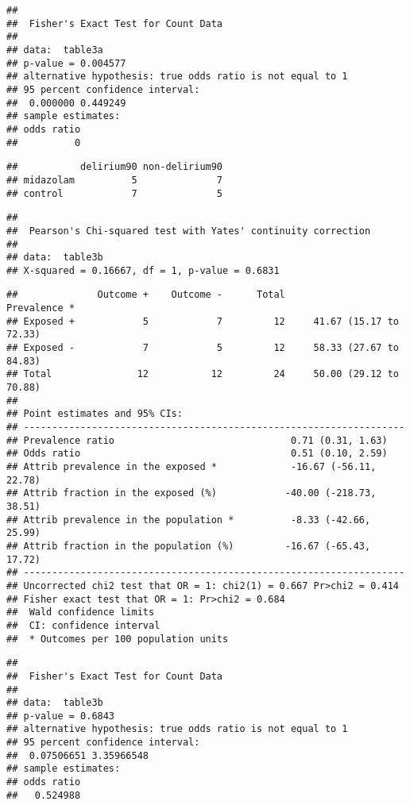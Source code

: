 \documentclass[
]{article}
\begin{document}
\begin{verbatim}
## 
##  Fisher's Exact Test for Count Data
## 
## data:  table3a
## p-value = 0.004577
## alternative hypothesis: true odds ratio is not equal to 1
## 95 percent confidence interval:
##  0.000000 0.449249
## sample estimates:
## odds ratio 
##          0
\end{verbatim}

\begin{verbatim}
##           delirium90 non-delirium90
## midazolam          5              7
## control            7              5
\end{verbatim}

\begin{verbatim}
## 
##  Pearson's Chi-squared test with Yates' continuity correction
## 
## data:  table3b
## X-squared = 0.16667, df = 1, p-value = 0.6831
\end{verbatim}

\begin{verbatim}
##              Outcome +    Outcome -      Total               Prevalence *
## Exposed +            5            7         12     41.67 (15.17 to 72.33)
## Exposed -            7            5         12     58.33 (27.67 to 84.83)
## Total               12           12         24     50.00 (29.12 to 70.88)
## 
## Point estimates and 95% CIs:
## -------------------------------------------------------------------
## Prevalence ratio                               0.71 (0.31, 1.63)
## Odds ratio                                     0.51 (0.10, 2.59)
## Attrib prevalence in the exposed *             -16.67 (-56.11, 22.78)
## Attrib fraction in the exposed (%)            -40.00 (-218.73, 38.51)
## Attrib prevalence in the population *          -8.33 (-42.66, 25.99)
## Attrib fraction in the population (%)         -16.67 (-65.43, 17.72)
## -------------------------------------------------------------------
## Uncorrected chi2 test that OR = 1: chi2(1) = 0.667 Pr>chi2 = 0.414
## Fisher exact test that OR = 1: Pr>chi2 = 0.684
##  Wald confidence limits
##  CI: confidence interval
##  * Outcomes per 100 population units
\end{verbatim}

\begin{verbatim}
## 
##  Fisher's Exact Test for Count Data
## 
## data:  table3b
## p-value = 0.6843
## alternative hypothesis: true odds ratio is not equal to 1
## 95 percent confidence interval:
##  0.07506651 3.35966548
## sample estimates:
## odds ratio 
##   0.524988
\end{verbatim}
\end{document}
